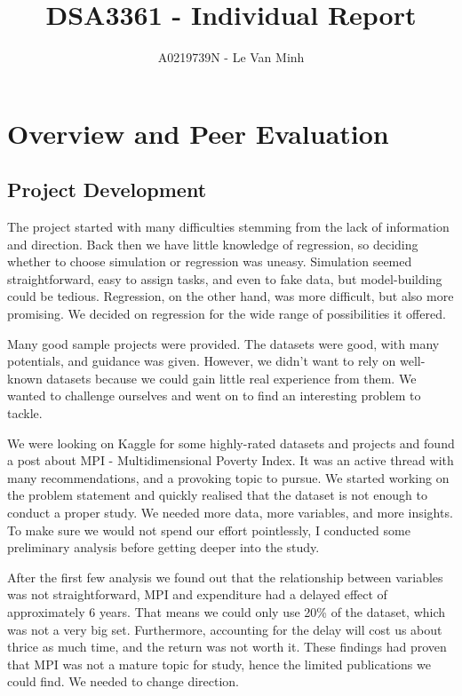 \documentclass[10pt,a4paper]{article}
\author{A0219739N - Le Van Minh}
\title{DSA3361 - Individual Report}
\begin{document}
\maketitle
\section{Overview and Peer Evaluation}

\subsection{Project Development}

The project started with many difficulties stemming from the lack of information and direction. Back then we have little knowledge of regression, so deciding whether to choose simulation or regression was uneasy. Simulation seemed straightforward, easy to assign tasks, and even to fake data, but model-building could be tedious. Regression, on the other hand, was more difficult, but also more promising. We decided on regression for the wide range of possibilities it offered.

Many good sample projects were provided. The datasets were good, with many potentials, and guidance was given. However, we didn't want to rely on well-known datasets because we could gain little real experience from them. We wanted to challenge ourselves and went on to find an interesting problem to tackle.

We were looking on Kaggle for some highly-rated datasets and projects and found a post about MPI - Multidimensional Poverty Index. It was an active thread with many recommendations, and a provoking topic to pursue. We started working on the problem statement and quickly realised that the dataset is not enough to conduct a proper study. We needed more data, more variables, and more insights. To make sure we would not spend our effort pointlessly, I conducted some preliminary analysis before getting deeper into the study.

After the first few analysis we found out that the relationship between variables was not straightforward, MPI and expenditure had a delayed effect of approximately 6 years. That means we could only use 20\% of the dataset, which was not a very big set. Furthermore, accounting for the delay will cost us about thrice as much time, and the return was not worth it. These findings had proven that MPI was not a mature topic for study, hence the limited publications we could find. We needed to change direction.
\end{document}
